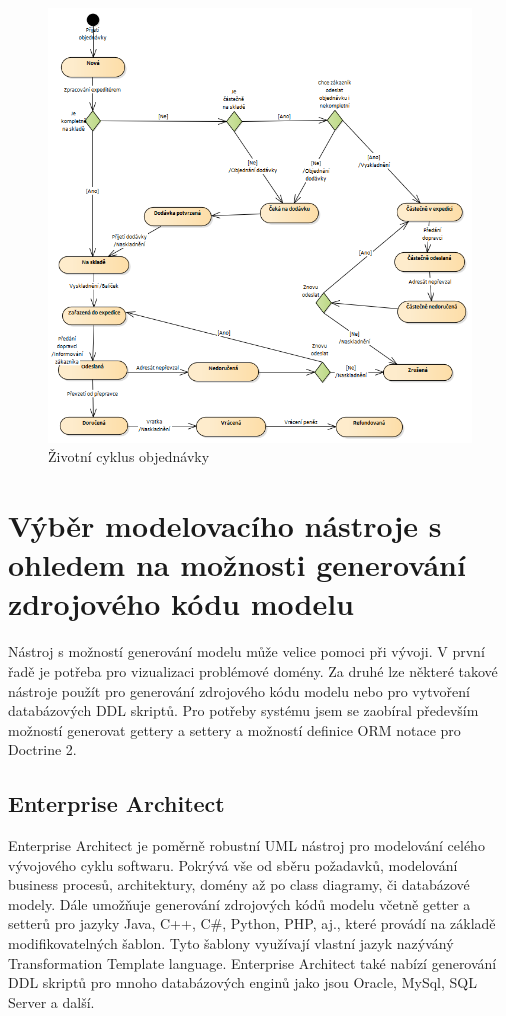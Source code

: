 \documentclass[thesis=B,czech]{FITthesis}[2012/06/26]
\begin{document}
\begin{figure}
	\includegraphics[width=\textwidth]{order_cycle.png}
	\caption{Životní cyklus objednávky}\label{oredr_cycle}
\end{figure}


\section{Výběr modelovacího nástroje s ohledem na možnosti generování zdrojového kódu modelu}
	Nástroj s možností generování modelu může velice pomoci při vývoji. V první řadě je potřeba pro vizualizaci problémové domény. Za druhé lze některé takové nástroje použít pro generování zdrojového kódu modelu nebo pro vytvoření databázových DDL skriptů. Pro potřeby systému jsem se zaobíral především možností generovat gettery a settery a možností definice ORM notace pro Doctrine 2.

\subsection{Enterprise Architect}
	Enterprise Architect je poměrně robustní UML nástroj pro modelování celého vývojového cyklu softwaru. Pokrývá vše od sběru požadavků, modelování business procesů, architektury, domény až po class diagramy, či databázové modely. Dále umožňuje generování zdrojových kódů modelu včetně getter a setterů pro jazyky Java, C++, C\#, Python, PHP, aj., které provádí na základě modifikovatelných šablon. Tyto šablony využívají vlastní jazyk nazýváný Transformation Template language. Enterprise Architect také nabízí generování DDL skriptů pro mnoho databázových enginů jako jsou Oracle, MySql, SQL Server a další.
\end{document}

